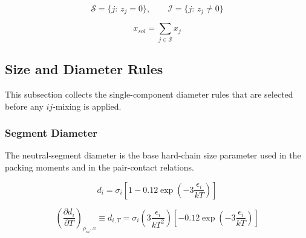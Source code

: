 \documentclass[12pt, letterpaper]{article}
\begin{document}
\begin{equation}
    \mathcal S=\{j:\,z_{j}=0\},\qquad \mathcal I=\{j:\,z_{j}\neq 0\}
    \label{eq:solvent_ion_sets}
\end{equation}


\begin{equation}
    x_{sol}=\sum_{j\in\mathcal S}x_{j}
    \label{eq:x_solvent_total}
\end{equation}

\subsection{Size and Diameter Rules}

This subsection collects the single-component diameter rules that are selected before any \(ij\)-mixing is applied.

\subsubsection{Segment Diameter}

The neutral-segment diameter is the base hard-chain size parameter used in the packing moments and in the pair-contact relations.

\begin{equation}
    d_{i}=\sigma_{i}\left[1-0.12 \exp \left(-3 \frac{\epsilon_{i}}{k T}\right)\right]
    \label{eq:d_segment}
\end{equation}


\begin{equation}
    \left(\frac{\partial d_i}{\partial T}\right)_{\rho_m,x}
    \equiv d_{i,T}
    =\sigma_{i}\left(3\frac{\epsilon_{i}}{kT^2}\right)\left[-0.12\exp\left(-3\frac{\epsilon_{i}}{kT}\right)\right]
    \label{eq:d_segment_dT}
\end{equation}
\end{document}
